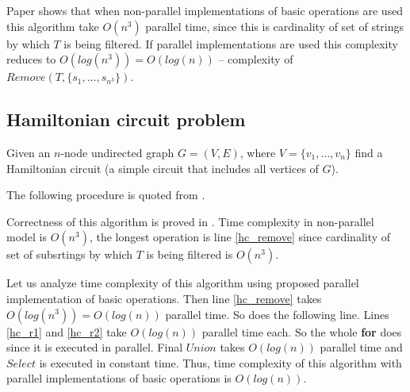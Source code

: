 
Paper \cite{Katsanyi:2003} shows that when non-parallel implementations of basic operations are used this algorithm take $O(n^3)$ parallel time, since this is cardinality of set of strings by which $T$ is being filtered. If parallel implementations are used this complexity reduces to $O(log(n^3))=O(log(n))$ -- complexity of $Remove(T, \{s_1, \dots, s_{n^3}\})$.

\subsection{Hamiltonian circuit problem}

Given an $n$-node undirected graph $G = (V, E)$, where $V=\{v_1, \dots, v_n\}$ find a Hamiltonian circuit (a simple circuit that includes all vertices of $G$).

The following procedure is quoted from \cite{Katsanyi:2003}.


Correctness of this algorithm is proved in \cite{Katsanyi:2003}. Time complexity in non-parallel model is $O(n^3)$, the longest operation is line \ref{hc_remove} since cardinality of set of subsrtings by which $T$ is being filtered is $O(n^3)$.

Let us analyze time complexity of this algorithm using proposed parallel implementation of basic operations. Then line \ref{hc_remove} takes $O(log(n^3))=O(log(n))$ parallel time. So does the following line. Lines \ref{hc_r1} and \ref{hc_r2} take $O(log(n))$ parallel time each. So the whole {\bf for} does since it is executed in parallel. Final $Union$ takes $O(log(n))$ parallel time and $Select$ is executed in constant time. Thus, time complexity of this algorithm with parallel implementations of basic operations is $O(log(n))$.

